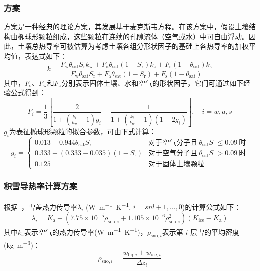 \subsubsection{\citet{de1963thermal}方案}
\citet{de1963thermal}方案是一种经典的理论方案，其发展基于麦克斯韦方程。在该方案中，假设土壤结构由椭球形颗粒组成，这些颗粒在连续的孔隙流体（空气或水）中可自由浮动。因此，土壤总热导率可被估算为考虑土壤各组分形状因子的基础上各热导率的加权平均值，表达式如下：$$k=\frac{F_{\mathrm {w}} \theta_{\mathrm {sat}}S_{\mathrm {r}}k_{\mathrm {w}} +F_{\mathrm {a}} \theta_{\mathrm {sat}} \left(1-S_{\mathrm {r}} \right)k_{\mathrm {a}} +F_{\mathrm {s}} \left(1-\theta_{\mathrm {sat}} \right)k_{\mathrm {s}} }{F_{\mathrm {w}} \theta_{\mathrm {sat}}S_{\mathrm {r}} +F_{\mathrm {a}} \theta_{\mathrm {sat}} \left(1-S_{\mathrm {r}} \right)+F_{\mathrm {s}} \left(1-\theta_{\mathrm {sat}} \right)}$$
其中，$F_{\mathrm {s}} $、$F_{\mathrm {w}} $和$F_{\mathrm {a}} $分别表示固体土壤、水和空气的形状因子，它们可通过如下经验公式得到：
\begin{equation}
  F_{i} =\frac{1}{3}\left[\frac{2}{1+\left(\frac{k_{i} }{k_{\mathrm {w}} }-1\right)g_{i} }+\frac{1}{1+\left(\frac{k_{i} }{k_{\mathrm {w}} }-1\right)(1-2g_{i} )}\right],\quad i=w,a,s
\end{equation}
$g_{i} $为表征椭球形颗粒的拟合参数，可由下式计算：
\begin{equation}
  g_{i} =\begin{cases}
    0.013+0.944\theta_{\mathrm {sat}}S_{\mathrm {r}}   & \text{对于空气分子且}\ \theta_{\mathrm {sat}}S_{\mathrm {r}} \leqslant 0.09\ \text{时} \\
    0.333-\left(0.333-0.035\right)\left(1-S_{\mathrm {r}} \right) & \text{对于空气分子且}\ \theta_{\mathrm {sat}}S_{\mathrm {r}} >0.09\ \text{时} \\
    0.125 &\text{对于固体土壤颗粒}
  \end{cases}
\end{equation}


\subsubsection{积雪导热率计算方案}
根据~\citet{jordan1991one}，雪盖热力传导率$\lambda_{i} $ (\unit{W.m^{-1}.K^{-1}}, $i=snl+1,\ldots,0$)的计算公式如下：
\begin{equation}
  \lambda_{i}=K_{\mathrm {a}}+\left(7.75 \times 10^{-5} \rho_{\mathrm{sno},i}+1.105 \times 10^{-6} \rho_{\mathrm{sno},i}^{2}\right)\left(K_{\mathrm {ice}}-K_{\mathrm {a}}\right)
\end{equation}
其中$k_{\mathrm {a}} $表示空气的热力传导率(\unit{W.m^{-1}.K^{-1}})，$\rho_{\mathrm{sno},i}$表示第 $i$ 层雪的平均密度(\unit{kg.m^{-3}})：
\begin{equation}
  \rho_{\mathrm{sno},i}=\frac{w_{\mathrm{liq},i}+w_{\mathrm{ice},i}}{\Delta z_{i}}
\end{equation}
